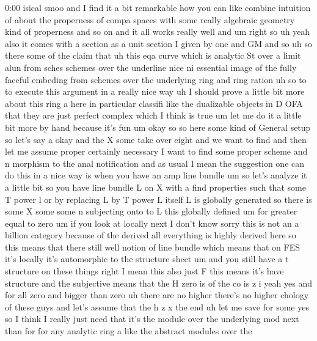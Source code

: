 \begin{unfinished}{0:00}
isical
smoo
and  I  find  it  a  bit  remarkable  how  you
can  like  combine  intuition  of  about  the
properness  of  compa  spaces  with  some
really  algebraic  geometry  kind  of
properness  and  so  on  and  it  all  works
really
well
and
um  right  so  uh  yeah  also  it  comes  with  a
section  as  a  unit
section  I  given  by  one  and
GM
and
so
uh  so  there  some  of  the  claim
that  uh  this
eqa  curve  which  is  analytic  St  over
a
limit  alun  from
sches  schemes  over  the
underline
nice  ni  essential  image  of  the  fully
faceful  embeding  from  schemes  over  the
underlying  ring  and  ring
ration
uh  so  to  to  execute  this  argument  in  a
really  nice  way
uh  I  should  prove  a  little  bit  more
about  this  ring  a  here  in  particular
classifi  like  the  dualizable  objects  in
D  OFA  that  they  are  just  perfect  complex
which  I  think  is  true  um  let  me  do  it  a
little  bit  more  by  hand  because  it's  fun
um  okay
so  so  here  some  kind  of  General
setup  so  let's  say
a  okay  and  the  X  some  take  over
eight  and  we  want  to
find  and  then  let  me  assume
proper  certainly  necessary  I  want  to
find  some  proper
scheme  and  n  morphism
to  the  anal
notification
and  as  usual  I  mean  the  suggestion  one
can  do  this  in  a  nice  way  is  when  you
have  an  amp  line
bundle  um  so  let's  analyze  it  a  little
bit
so  you
have  line
bundle  L  on  X  with  a  find  properties
such
that  some  T  power  l  or  by  replacing  L  by
T  power  L  itself  L  is  globally
generated
so  there  is  some  X  some  some
n  subjecting  onto  to
L  this  globally
defined
um  for  greater  equal  to  zero  um  if  you
look  at
locally
next  I  don't
know  sorry  this  is  not  an  a  billion
category  because  of  the  derived  all
everything  is  highly  derived  here  so
this  means
that  there  still  well  notion  of  line
bundle  which  means  that  on  FES  it's
locally  it's  automorphic  to  the
structure  sheet  um  and  you  still  have  a
t  structure  on  these  things  right  I  mean
this  also  just  F  this
means  it's  have  structure  and  the
subjective  means  that  the  H  zero  is  of
the  co  is  z  i  yeah
yes  and  for
all  zero  and  bigger  than  zero  uh  there
are  no  higher  there's  no  higher
chology  of  these
guys  and  let's  assume  that  the  h  z  x  the
end  uh  let  me  save  for
some  yes  so  I  think  I  really  just  need
that  it's  the  module  over  the
underlying  mod
next  than  for  for  any  analytic  ring  a
like  the  abstract  modules  over  the

\end{unfinished}
